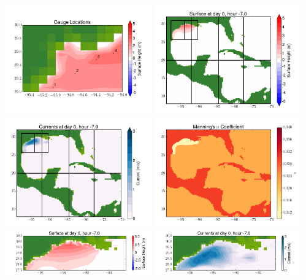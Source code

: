 \documentclass[11pt]{article}
\begin{document}
\includegraphics[width=0.475\textwidth]{frame0064fig10.png}
\vskip 10pt 
\includegraphics[width=0.475\textwidth]{frame0065fig1.png}
\includegraphics[width=0.475\textwidth]{frame0065fig2.png}
\vskip 10pt 
\includegraphics[width=0.475\textwidth]{frame0065fig3.png}
\includegraphics[width=0.475\textwidth]{frame0065fig4.png}
\vskip 10pt 
\includegraphics[width=0.475\textwidth]{frame0065fig5.png}
\end{document}
